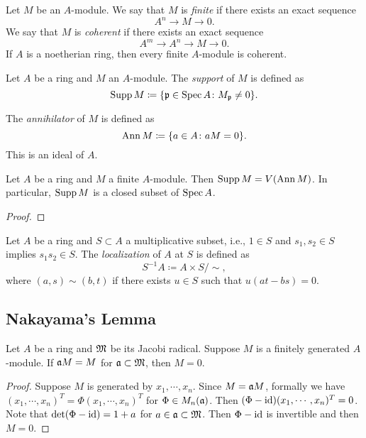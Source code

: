     Let \(M\) be an \(A\)-module.
    We say that \(M\) is \emph{finite} if there exists an exact sequence
    \[ A^n \to M \to 0. \]
    We say that \(M\) is \emph{coherent} if there exists an exact sequence
    \[ A^m \to A^n \to M \to 0. \]
    If \(A\) is a noetherian ring, then every finite \(A\)-module is coherent.

    \begin{definition}\label{def: support of a module}
        Let \(A\) be a ring and \(M\) an \(A\)-module.
        The \emph{support} of \(M\) is defined as
        \[
            \operatorname{Supp} M \coloneqq \{ {\mathfrak{p}} \in \operatorname{Spec} A \colon M_{\mathfrak{p}} \neq 0\}.
        \]
    \end{definition}

    The \emph{annihilator} of \(M\) is defined as
    \[ \operatorname{Ann} M \coloneqq \{ a \in A \colon aM = 0\}. \]
    This is an ideal of \(A\).

    \begin{proposition}\label{prop: support of a finite module}
        Let \(A\) be a ring and \(M\) a finite \(A\)-module.
        Then \(\operatorname{Supp} M = V(\operatorname{Ann} M)\).
        In particular, \(\operatorname{Supp} M\) is a closed subset of \(\operatorname{Spec} A\).
    \end{proposition}
    \begin{proof}
    \end{proof}

    \begin{definition}\label{def: localization}
        Let \(A\) be a ring and \(S \subset A\) a multiplicative subset, i.e., \(1 \in S\) and \(s_1,s_2 \in S\) implies \(s_1 s_2 \in S\).
        The \emph{localization} of \(A\) at \(S\) is defined as
        \[ S^{-1}A \coloneqq A \times S / \sim, \]
        where \((a,s) \sim (b,t)\) if there exists \(u \in S\) such that \(u(at - bs) = 0\).
    \end{definition}

    \begin{proposition}\label{prop: when is localization injective}
        
    \end{proposition}

\subsection{Nakayama's Lemma}

    \begin{theorem}\label{thm: Nakayama's lemma}
        Let $A$ be a ring and ${\mathfrak{M}}$ be its Jacobi radical.
        Suppose $M$ is a finitely generated $A$-module.
        If ${\mathfrak{a}} M = M$ for ${\mathfrak{a}} \subset {\mathfrak{M}}$, then $M = 0$.
    \end{theorem}
    \begin{proof}
        Suppose $M$ is generated by $x_1,\cdots,x_n$.
        Since $M = {\mathfrak{a}} M$, formally we have $(x_1,\cdots,x_n)^T = \Phi (x_1,\cdots, x_n)^T$ for $\Phi \in M_n({\mathfrak{a}})$.
        Then $(\Phi - {\operatorname{id}}) (x_1,\cdots, x_n)^T = 0$. 
        Note that $\det (\Phi - {\operatorname{id}}) = 1+a$ for $a \in {\mathfrak{a}} \subset {\mathfrak{M}}$.
        Then $\Phi-{\operatorname{id}}$ is invertible and then $M=0$.
    \end{proof}

